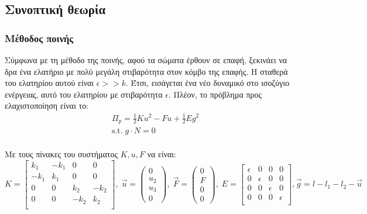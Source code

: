 \documentclass{article}
\begin{document}
\subsection{Συνοπτική θεωρία}
\subsubsection{Μέθοδος ποινής}
Σύμφωνα με τη μέθοδο της ποινής, αφού τα σώματα έρθουν σε επαφή, ξεκινάει να δρα ένα ελατήριο με πολύ μεγάλη στιβαρότητα στον κόμβο της επαφής. Η σταθερά του ελατηρίου αυτού είναι $\epsilon >> k$. Έτσι, εισάγεται ένα νέο δυναμικό στο ισοζύγιο ενέργειας, αυτό του ελατηρίου με στιβαρότητα $\epsilon$. Πλέον, το πρόβλημα προς ελαχιστοποίηση είναι το:
 \begin{align}
    &\Pi_p = \frac{1}{2}Ku^2 - F u + \frac{1}{2}E g ^2\\
    &\text{s.t.}\;  g\cdot N = 0\\
\end{align}

Με τους πίνακες του συστήματος $K, u, F$ να είναι:
\begin{equation}
    K = \begin{bmatrix}
        k_1 &-k_1 & 0 & 0\\
        -k_1 & k_1 & 0 & 0\\
        0 &0 & k_2 & -k_2\\
        0 &0 & -k_2 & k_2\\
    \end{bmatrix},\; \vec{u} = \begin{pmatrix}
        0\\ u_2 \\ u_3\\ 0
    \end{pmatrix},\; \vec{F} = \begin{pmatrix}
        0\\ F\\ 0\\0
    \end{pmatrix}, \; E = \begin{bmatrix}
        \epsilon & 0 & 0 & 0\\
        0 & \epsilon & 0 & 0\\
         0 & 0 & \epsilon & 0\\
         0 & 0 & 0 & \epsilon\\
    \end{bmatrix}, \vec{g} = l - l_1 - l_2 - \vec{u}
\end{equation}
\end{document}
